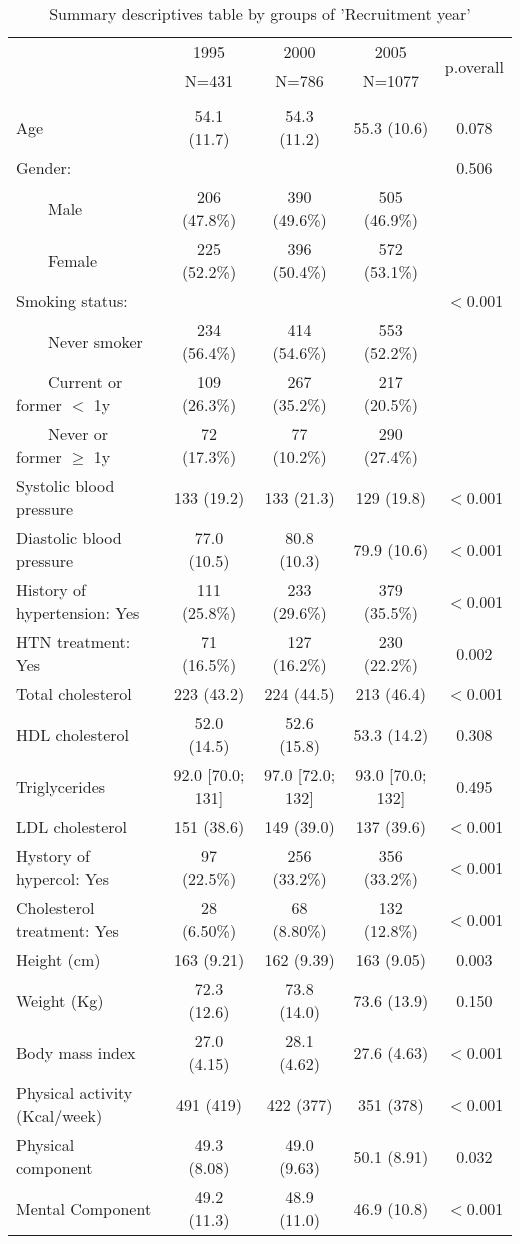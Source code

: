 
  \begin{table}[ht]
  \caption{Summary descriptives table by groups of 'Recruitment year'}
  \begin{center}     
  \begin{tabular}{lcccc} 
  \hline 
  & 1995 & 2000 & 2005 & \multirow{2}{*}{p.overall} \\ 
  &  N=431 & N=786 & N=1077  &  \\ 
 \hline 
 \hline 
  &  &  &  &  \\ 
 Age & 54.1 (11.7) & 54.3 (11.2) & 55.3 (10.6) & 0.078 \\ 
 Gender: &  &  &  & 0.506 \\ 
 $\qquad$Male & 206 (47.8\%) & 390 (49.6\%) & 505 (46.9\%) &  \\ 
 $\qquad$Female & 225 (52.2\%) & 396 (50.4\%) & 572 (53.1\%) &  \\ 
 Smoking status: &  &  &  & $<$0.001 \\ 
 $\qquad$Never smoker & 234 (56.4\%) & 414 (54.6\%) & 553 (52.2\%) &  \\ 
 $\qquad$Current or former $<$ 1y & 109 (26.3\%) & 267 (35.2\%) & 217 (20.5\%) &  \\ 
 $\qquad$Never or former $\geq$ 1y & 72 (17.3\%) & 77 (10.2\%) & 290 (27.4\%) &  \\ 
 Systolic blood pressure & 133 (19.2) & 133 (21.3) & 129 (19.8) & $<$0.001 \\ 
 Diastolic blood pressure & 77.0 (10.5) & 80.8 (10.3) & 79.9 (10.6) & $<$0.001 \\ 
 History of hypertension: Yes & 111 (25.8\%) & 233 (29.6\%) & 379 (35.5\%) & $<$0.001 \\ 
 HTN treatment: Yes & 71 (16.5\%) & 127 (16.2\%) & 230 (22.2\%) & 0.002 \\ 
 Total cholesterol & 223 (43.2) & 224 (44.5) & 213 (46.4) & $<$0.001 \\ 
 HDL cholesterol & 52.0 (14.5) & 52.6 (15.8) & 53.3 (14.2) & 0.308 \\ 
 Triglycerides & 92.0 [70.0; 131] & 97.0 [72.0; 132] & 93.0 [70.0; 132] & 0.495 \\ 
 LDL cholesterol & 151 (38.6) & 149 (39.0) & 137 (39.6) & $<$0.001 \\ 
 Hystory of hypercol: Yes & 97 (22.5\%) & 256 (33.2\%) & 356 (33.2\%) & $<$0.001 \\ 
 Cholesterol treatment: Yes & 28 (6.50\%) & 68 (8.80\%) & 132 (12.8\%) & $<$0.001 \\ 
 Height (cm) & 163 (9.21) & 162 (9.39) & 163 (9.05) & 0.003 \\ 
 Weight (Kg) & 72.3 (12.6) & 73.8 (14.0) & 73.6 (13.9) & 0.150 \\ 
 Body mass index & 27.0 (4.15) & 28.1 (4.62) & 27.6 (4.63) & $<$0.001 \\ 
 Physical activity (Kcal/week) & 491 (419) & 422 (377) & 351 (378) & $<$0.001 \\ 
 Physical component & 49.3 (8.08) & 49.0 (9.63) & 50.1 (8.91) & 0.032 \\ 
 Mental Component & 49.2 (11.3) & 48.9 (11.0) & 46.9 (10.8) & $<$0.001 \\ 
 \hline 
\end{tabular} 
  \end{center}   
  \end{table}

